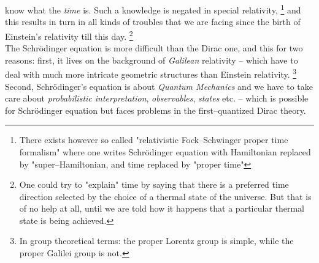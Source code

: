 \documentclass[12pt]{article}
\begin{document}
know what the {\sl time} is.  Such a knowledge is negated in special
relativity, \footnote{There exists however so called "relativistic
Fock--Schwinger proper time formalism" \cite[Ch. 2--5--4]{itz} where
one writes Schr\"odinger equation with Hamiltonian replaced by
"super--Hamiltonian,  and time replaced by "proper time"} and this results
in turn in all kinds of troubles that we are facing since the birth of
Einstein's relativity till this day.
\footnote{One could try to "explain" time by saying that there is a
preferred time direction selected by
the choice of a thermal state of the universe. But that is of no help
at all, until
we are told how it happens that a particular thermal state is
being achieved.}
\\ The Schr\"odinger equation is more
difficult than the Dirac one,  and this for two reasons: 
first,  it lives on the
background of {\sl Galilean} relativity -- which have to deal with much more
intricate geometric structures than Einstein relativity. \footnote{
In group theoretical terms:  the proper Lorentz group is simple, 
while the proper Galilei group is not. } 
 Second, 
Schr\"odinger's equation is about {\sl Quantum Mechanics} and we have to take
care about {\sl probabilistic interpretation},  {\sl observables},  {\sl states
} etc.  -- which is possible for Schr\"odinger equation but faces
problems in the first--quantized Dirac theory.
\end{document}
